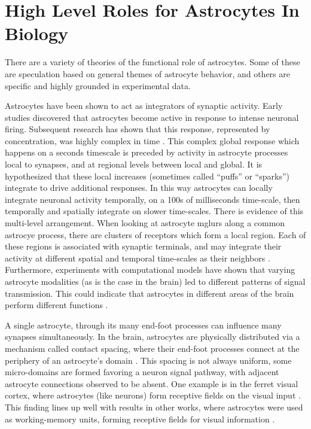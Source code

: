 
    \section{High Level Roles for Astrocytes In Biology}

    There are a variety of theories of the functional role of astrocytes.
    Some of these are speculation based on general themes of astrocyte behavior,
    and others are specific and highly grounded in experimental data.

    Astrocytes have been shown to act as integrators of synaptic activity. Early
    studies discovered that astrocytes become active in response to intense
    neuronal firing. Subsequent research has shown that this response, represented
    by \ca concentration, was highly complex in time
    \parencite{araque_2014}. This complex global response which happens on a
    seconds timescale is preceded by \ca activity in astrocyte processes local
    to synapses, and at regional levels between local and global. It is
    hypothesized that these local \ca increases (sometimes called ``puffs'' or
    ``sparks'') integrate to drive additional responses. In this way astrocytes
    can locally integrate neuronal activity temporally, on a 100s of
    milliseconds time-scale, then temporally and spatially integrate on slower
    time-scales. There is evidence of this multi-level arrangement. When looking
    at astrocyte \glspl{mglur} along a common astrocye process, there are
    clusters of receptors which form a local region. Each of these regions is
    associated with synaptic terminals, and may integrate their activity at
    different spatial and temporal time-scales as their neighbors
    \parencite{pitta_2012}. Furthermore, experiments with computational models
    have shown that varying astrocyte modalities (as is the case in the brain) led
    to different patterns of signal transmission. This could indicate that
    astrocytes in different areas of the brain perform different functions
    \parencite{pitta_2012}.

    A single astrocyte, through its many end-foot processes can influence many
    synapses simultaneously. In the brain, astrocytes are physically distributed
    via a mechanism called contact spacing, where their end-foot processes
    connect at the periphery of an astrocyte's domain
    \parencite{pitta_2012}. This spacing is not always uniform, some
    micro-domains are formed favoring a neuron signal pathway, with adjacent
    astrocyte connections observed to be absent. One example is in the ferret
    visual cortex, where astrocytes (like neurons) form receptive fields on the
    visual input \parencite{pitta_2012}. This finding lines up well with results
    in other works, where astrocytes were used as working-memory units, forming
    receptive fields for visual information \parencite{gordleeva_2021}.

